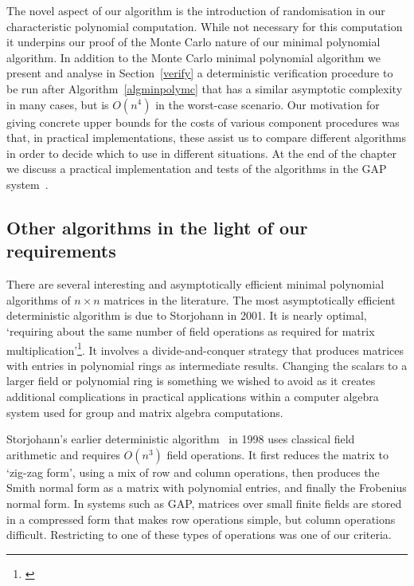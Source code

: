 The novel aspect of our algorithm 
is the introduction of randomisation in our characteristic polynomial computation. While
not necessary for this computation it underpins our proof of the Monte Carlo 
nature of our minimal polynomial algorithm. In addition to the Monte Carlo
minimal polynomial algorithm
we present and analyse in Section~\ref{verify} a deterministic verification procedure to
be run after Algorithm~\ref{algminpolymc} that has a similar asymptotic
complexity in many cases, but is $O(n^4)$ in the worst-case scenario.
Our motivation for giving concrete upper bounds for the costs of 
various component procedures was that, in practical implementations, 
these assist us to compare different algorithms in order to 
decide which to use in different situations. At the end of the chapter 
we discuss a practical implementation and tests of the algorithms in the
{\sf GAP} system~\cite{GAP4}.

\subsection{Other algorithms in the light of our requirements}

There are several interesting and asymptotically efficient
minimal polynomial algorithms of $n\times n$ matrices in the literature. The most  
asymptotically efficient deterministic algorithm is due to Storjohann 
\cite{Stor01} in 2001. It is nearly optimal, `requiring about the same number of 
field operations as required for matrix 
multiplication'\footnote{\cite[Abstract, p368]{Stor01}}. 
It involves a divide-and-conquer strategy that produces matrices 
with entries in polynomial rings as intermediate results. 
Changing the scalars to a larger field or polynomial ring is 
something we wished to avoid as it creates additional complications in practical 
applications within a computer algebra system used for group and 
matrix algebra computations.

Storjohann's earlier deterministic algorithm~\cite{Stor98} in 1998 uses classical 
field arithmetic and requires $O(n^3)$ field operations. 
It first reduces the matrix to `zig-zag form', using a mix of row 
and column operations, then produces the Smith normal form 
as a matrix with polynomial entries, and finally the Frobenius normal form.
In systems such as {\sf GAP}, matrices over small finite fields 
are stored in a compressed form that
makes row operations simple, but column operations difficult.
Restricting to one of these types of operations was one of our criteria.

